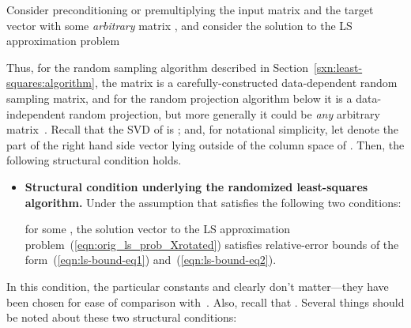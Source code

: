 \documentclass[twoside]{article}
\begin{document}
Consider preconditioning or premultiplying the input matrix  and the 
target vector  with some \emph{arbitrary} matrix ,
and consider the solution to the LS approximation problem

Thus, for the random sampling algorithm described in 
Section~\ref{sxn:least-squares:algorithm}, the matrix  is a 
carefully-constructed data-dependent random sampling matrix, and for the 
random projection algorithm below it is a data-independent random 
projection, but more generally it could be \emph{any} arbitrary 
matrix~.
Recall that the SVD of  is ; 
and, for notational simplicity, let 
 denote the  part of the right 
hand side vector  lying outside of the column space of .
Then, the following structural condition holds.
\begin{itemize}
\item
\textbf{Structural condition underlying the randomized least-squares 
algorithm.}
Under the assumption that  satisfies the following two conditions:

for some ,
the solution vector  to the LS approximation 
problem~(\ref{eqn:orig_ls_prob_Xrotated})
satisfies relative-error bounds of the form~(\ref{eqn:ls-bound-eq1})
and~(\ref{eqn:ls-bound-eq2}).
\end{itemize}
In this condition, the particular constants  and  clearly 
don't matter---they have been chosen for ease of comparison 
with~\cite{DMMS07_FastL2_NM10}.  
Also, recall that .
Several things should be noted about these two structural conditions:
\end{document}
